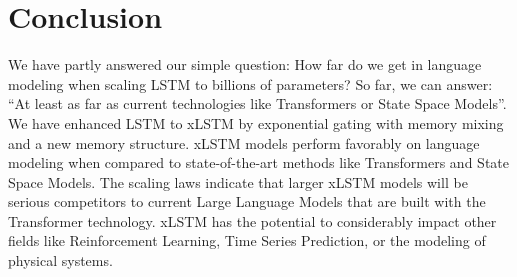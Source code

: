 \documentclass[dvipsnames]{article}
\begin{document}
\section{Conclusion}
We have partly answered our simple question:
How far do we get in language modeling
when scaling LSTM to billions of parameters?
So far, we can answer: ``At least as far as current technologies
like Transformers or State Space Models''.
We have enhanced LSTM to xLSTM by exponential gating with memory mixing
and a new memory structure.
xLSTM models perform favorably on language modeling
when compared to state-of-the-art methods like Transformers and
State Space Models.
The scaling laws indicate that larger xLSTM models will
be serious competitors to current Large Language Models
that are built with the Transformer technology.
xLSTM has the potential to considerably impact other fields
like Reinforcement Learning, Time Series Prediction,
or the modeling of physical systems.
\end{document}

